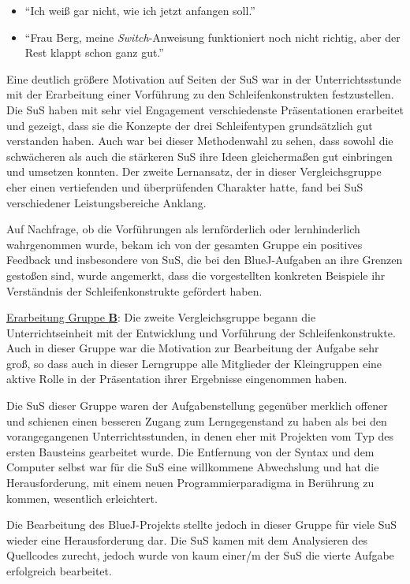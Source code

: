 \documentclass[paper=a4, DIV=13, BCOR=12mm, twoside=on, onecolumn=on, open = any, titlepage =on, parskip =half-, headsepline = on, footsepline = on, chapterprefix = on, sectionprefix = on, appendixprefix = off, fontsize = 11pt, numbers = noenddot, abstract = off]{scrreprt}
\begin{document}
\singlespacing
\begin{itemize}
\item "`Ich weiß gar nicht, wie ich jetzt anfangen soll."'
\item "`Frau Berg, meine \emph{Switch}-Anweisung funktioniert noch nicht richtig, aber der Rest klappt schon ganz gut."'
\end{itemize}
\onehalfspacing

Eine deutlich größere Motivation auf Seiten der SuS war in der Unterrichtsstunde mit der Erarbeitung einer Vorführung zu den Schleifenkonstrukten festzustellen. Die SuS haben mit sehr viel Engagement verschiedenste Präsentationen erarbeitet und gezeigt, dass sie die Konzepte der drei Schleifentypen grundsätzlich gut verstanden haben. Auch war bei dieser Methodenwahl zu sehen, dass sowohl die schwächeren als auch die stärkeren SuS ihre Ideen gleichermaßen gut einbringen und umsetzen konnten.
Der zweite Lernansatz, der in dieser Vergleichsgruppe eher einen vertiefenden und überprüfenden Charakter hatte, fand bei SuS verschiedener Leistungsbereiche Anklang.

Auf Nachfrage, ob die Vorführungen als lernförderlich oder lernhinderlich wahrgenommen wurde, bekam ich von der gesamten Gruppe ein positives Feedback und insbesondere von SuS, die bei den BlueJ-Aufgaben an ihre Grenzen gestoßen sind, wurde angemerkt, dass die vorgestellten konkreten Beispiele ihr Verständnis der Schleifenkonstrukte gefördert haben.


\underline{Erarbeitung Gruppe \textsc{\textbf{B}}}: Die zweite Vergleichsgruppe begann die Unterrichtseinheit mit der Entwicklung und Vorführung der Schleifenkonstrukte. Auch in dieser Gruppe war die Motivation zur Bearbeitung der Aufgabe sehr groß, so dass auch in dieser Lerngruppe alle Mitglieder der Kleingruppen eine aktive Rolle in der Präsentation ihrer Ergebnisse eingenommen haben. 

Die SuS dieser Gruppe waren der Aufgabenstellung gegenüber merklich offener und schienen einen besseren Zugang zum Lerngegenstand zu haben als bei den vorangegangenen Unterrichtsstunden, in denen eher mit Projekten vom Typ des ersten Bausteins gearbeitet wurde. Die Entfernung von der Syntax und dem Computer selbst war für die SuS eine willkommene Abwechslung und hat die Herausforderung, mit einem neuen Programmierparadigma in Berührung zu kommen, wesentlich erleichtert.

Die Bearbeitung des BlueJ-Projekts stellte jedoch in dieser Gruppe für viele SuS wieder eine Herausforderung dar. Die SuS kamen mit dem Analysieren des Quellcodes zurecht, jedoch wurde von kaum einer/m der SuS die vierte Aufgabe erfolgreich bearbeitet. 
\end{document}
